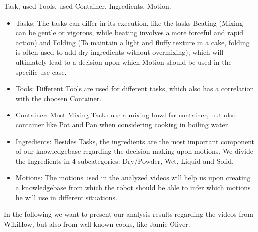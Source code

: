 	Task, used Tools, used Container, Ingredients, Motion.

	\begin{itemize}
		\item Tasks: The tasks can differ in its execution, like the tasks Beating (Mixing can be gentle or vigorous, while beating involves a more forceful and rapid action) and Folding (To maintain a light and fluffy texture in a cake, folding is often used to add dry ingredients without overmixing), which will ultimately lead to a decision upon which Motion should be used in the specific use case.
		\item Tools: Different Tools are used for different tasks, which also has a correlation with the choosen Container.
		\item Container: Most Mixing Tasks use a mixing bowl for container, but also container like Pot and Pan when considering cooking in boiling water.
		\item Ingredients: Besides Tasks, the ingredients are the most important component of our knowledgebase regarding the decision making upon motions. We divide the Ingredients in 4 subcategories: Dry/Powder, Wet, Liquid and Solid.
		\item Motions: The motions used in the analyzed videos will help us upon creating a knowledgebase from which the robot should be able to infer which motions he will use in different situations.
	\end{itemize}

	In the following we want to present our analysis results regarding the videos from WikiHow, but also from well known cooks, like Jamie Oliver:



